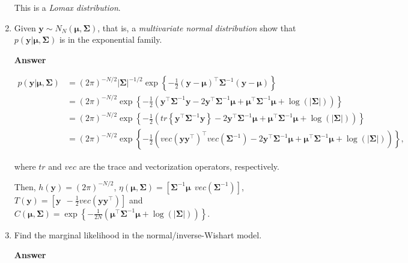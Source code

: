 \begin{enumerate}[leftmargin=*]
This is a \textit{Lomax distribution}.

\item Given $\mathbf{y}\sim N_N(\bm{\mu},\bm{\Sigma})$, that is, a \textit{multivariate normal distribution} show that $p(\mathbf{y}|\bm{\mu},\bm{\Sigma})$ is in the exponential family.

\textbf{Answer} 

\begin{align}
	p(\mathbf{y}|\bm{\mu},\bm{\Sigma})&= (2\pi)^{-N/2}|\bm{\Sigma}|^{-1/2}\exp\left\{-\frac{1}{2}\left(\mathbf{y}-\bm{\mu}\right)^{\top}\bm{\Sigma}^{-1}\left(\mathbf{y}-\bm{\mu}\right)\right\}\nonumber\\
	&= (2\pi)^{-N/2}\exp\left\{-\frac{1}{2}\left(\mathbf{y}^{\top}\bm{\Sigma}^{-1}\mathbf{y}-2\mathbf{y}^{\top}\bm{\Sigma}^{-1}\bm{\mu}+\bm{\mu}^{\top}\bm{\Sigma}^{-1}\bm{\mu}+\log(|\mathbf{\Sigma}|)\right)\right\}\nonumber\\
	&= (2\pi)^{-N/2}\exp\left\{-\frac{1}{2}\left(tr\left\{\mathbf{y}^{\top}\bm{\Sigma}^{-1}\mathbf{y}\right\}-2\mathbf{y}^{\top}\bm{\Sigma}^{-1}\bm{\mu}+\bm{\mu}^{\top}\bm{\Sigma}^{-1}\bm{\mu}+\log(|\mathbf{\Sigma}|)\right)\right\}\nonumber\\
	&= (2\pi)^{-N/2}\exp\left\{-\frac{1}{2}\left(vec\left(\mathbf{y}\mathbf{y}^{\top}\right)^{\top}vec\left(\bm{\Sigma}^{-1}\right)-2\mathbf{y}^{\top}\bm{\Sigma}^{-1}\bm{\mu}+\bm{\mu}^{\top}\bm{\Sigma}^{-1}\bm{\mu}+\log(|\mathbf{\Sigma}|)\right)\right\} \nonumber, 	
\end{align}

where $tr$ and $vec$ are the trace and vectorization operators, respectively. 

Then, $h(\mathbf{y})=(2\pi)^{-N/2}$, $\eta(\bm{\mu},\bm{\Sigma})=\left[\bm{\Sigma}^{-1}\bm{\mu} \ \ vec\left(\bm{\Sigma}^{-1}\right)\right]$, $T(\mathbf{y})=\left[\mathbf{y} \ \ -\frac{1}{2}vec(\mathbf{y}\mathbf{y}^{\top})\right]$ and $C(\bm{\mu},\bm{\Sigma})=\exp\left\{-\frac{1}{2N}\left(\bm{\mu}^{\top}\bm{\Sigma}^{-1}\bm{\mu}+\log(|\mathbf{\Sigma}|)\right)\right\}$.
	
\item Find the marginal likelihood in the normal/inverse-Wishart model.

\textbf{Answer}


\end{enumerate}
